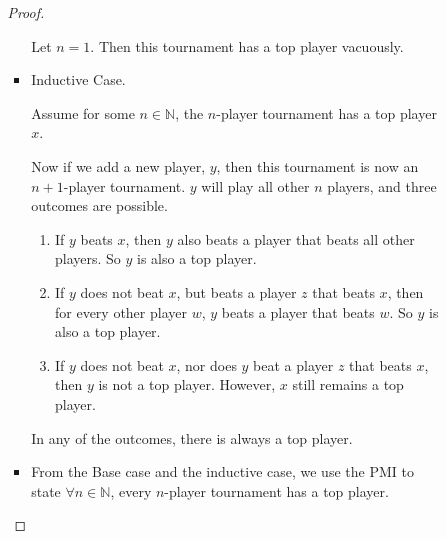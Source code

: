\documentclass[12pt,letterpaper]{article}
\begin{document}
\begin{enumerate}
\begin{enumerate}
\begin{enumerate}
\begin{proof}
\begin{itemize}
                    Let $n = 1$.
                    Then this tournament has a top player vacuously.
                  \item Inductive Case.

                    Assume for some $n \in \mathbb{N}$,
                    the $n$-player tournament has a top player $x$.

                    Now if we add a new player, $y$,
                    then this tournament is now an $n + 1$-player tournament.
                    $y$ will play all other $n$ players,
                    and three outcomes are possible.

                    \begin{enumerate}
                      \item
                        If $y$ beats $x$,
                        then $y$ also beats a player that beats all other players.
                        So $y$ is also a top player.
                      \item
                        If $y$ does not beat $x$, but beats a player $z$ that beats $x$,
                        then for every other player $w$, $y$ beats a player that beats $w$.
                        So $y$ is also a top player.
                      \item
                        If $y$ does not beat $x$, nor does $y$ beat a player $z$ that beats $x$,
                        then $y$ is not a top player.
                        However, $x$ still remains a top player.
                    \end{enumerate}

                    In any of the outcomes, there is always a top player.

                  \item
                    From the Base case and the inductive case,
                    we use the PMI to state $\forall n \in \mathbb{N}$,
                    every $n$-player tournament has a top player.
                \end{itemize}
              \end{proof}
          \end{enumerate}
      \end{enumerate}
  \end{enumerate}
\end{document}
